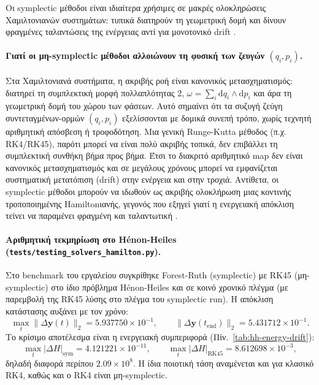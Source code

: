 \documentclass[11pt,a4paper]{report}
\begin{document}
Οι symplectic μέθοδοι είναι ιδιαίτερα χρήσιμες σε μακρές ολοκληρώσεις
Χαμιλτονιανών συστημάτων: τυπικά διατηρούν τη γεωμετρική δομή και δίνουν
φραγμένες ταλαντώσεις της ενέργειας αντί για μονοτονικό drift
\cite{hairer_lubich_wanner,lubich_symplectic}.

\paragraph{Γιατί οι μη-symplectic μέθοδοι αλλοιώνουν τη φυσική των ζευγών \texorpdfstring{$(q_i,p_i)$}{(q,p)}.}
Στα Χαμιλτονιανά συστήματα, η ακριβής ροή είναι κανονικός μετασχηματισμός:
διατηρεί τη συμπλεκτική μορφή πολλαπλότητας 2,
$\omega=\sum_i \mathrm{d}q_i\wedge \mathrm{d}p_i$ και άρα τη γεωμετρική δομή
του χώρου των φάσεων.
Αυτό σημαίνει ότι τα συζυγή ζεύγη συντεταγμένων-ορμών $(q_i,p_i)$ εξελίσσονται
με δομικά συνεπή τρόπο, χωρίς τεχνητή αριθμητική απόσβεση ή τροφοδότηση.
Μια γενική Runge-Kutta μέθοδος (π.χ. RK4/RK45), παρότι μπορεί να είναι πολύ
ακριβής τοπικά, δεν επιβάλλει τη συμπλεκτική συνθήκη βήμα προς βήμα.
Έτσι το διακριτό αριθμητικό map δεν είναι κανονικός μετασχηματισμός και σε
μεγάλους χρόνους μπορεί να εμφανίζεται συστηματική μετατόπιση (drift) στην
ενέργεια και στην τροχιά.
Αντίθετα, οι symplectic μέθοδοι μπορούν να ιδωθούν ως ακριβής ολοκλήρωση
μιας κοντινής τροποποιημένης Hamiltonιανής, γεγονός που εξηγεί γιατί η
ενεργειακή απόκλιση τείνει να παραμένει φραγμένη και ταλαντωτική
\cite{hairer_lubich_wanner,lubich_symplectic}.

\begin{resultsbox}
\paragraph{Αριθμητική τεκμηρίωση στο H\'enon-Heiles (\texttt{tests/testing\_solvers\_hamilton.py}).}
Στο benchmark του εργαλείου συγκρίθηκε Forest-Ruth (symplectic) με RK45
(μη-symplectic) στο ίδιο πρόβλημα H\'enon-Heiles και σε κοινό χρονικό πλέγμα
(με παρεμβολή της RK45 λύσης στο πλέγμα του symplectic run).
Η απόκλιση κατάστασης αυξάνει με τον χρόνο:
\begin{equation}
\max_t \|\Delta \mathbf{y}(t)\|_2 = 5.937750\times 10^{-1},
\qquad
\|\Delta \mathbf{y}(t_{\mathrm{end}})\|_2 = 5.431712\times 10^{-1}.
\end{equation}
Το κρίσιμο αποτέλεσμα είναι η ενεργειακή συμπεριφορά (Πίν.~\ref{tab:hh-energy-drift}):
\begin{equation}
\max_t |\Delta H|_{\mathrm{sym}} = 4.121221\times 10^{-11},
\qquad
\max_t |\Delta H|_{\mathrm{RK45}} = 8.612698\times 10^{-3},
\end{equation}
δηλαδή διαφορά περίπου $2.09\times 10^8$.
Η ίδια ποιοτική τάση αναμένεται και για κλασικό RK4, καθώς και ο RK4 είναι
μη-symplectic.
\end{resultsbox}
\end{document}

